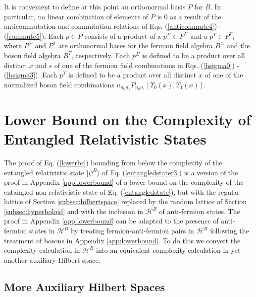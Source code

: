 \documentclass[12pt,amsmath,amssymb,onecolumn]{revtex4-2}
\begin{document}
It is convenient to define at this point an orthonormal basis $P$ for $B$.
In particular, no linear combination
of elements of $P$ is 0 as a result of the anticommutation and
commutation relations of Eqs. (\ref{anticommute4}) - (\ref{commute5}).
Each $p \in P$ consists of a product of a $p^\Sigma \in P^\Sigma$ and
a $p^\Upsilon \in P^\Upsilon$, where
$P^\Sigma$ and $P^\Upsilon$ are orthonormal bases for the fermion
field algebra $B^\Sigma$ and the boson field algebra $B^\Upsilon$, respectively.
Each $p^\Sigma$ is defined to be a product over all distinct $x$ and
$s$ of one of the fermion field combinations in Eqs. (\ref{hsigma0}) - (\ref{hsigma3}).
Each $p^\Upsilon$ is defined to be a product over all distinct $x$ of one of the normalized boson field
combinations $u_{n_0 n_1} P_{n_0 n_1}[\Upsilon_0(x),\Upsilon_1(x)]$.



\section{\label{app:lowerboundr} Lower Bound on the Complexity of Entangled Relativistic States}


The proof of Eq. (\ref{lowerbr}) bounding from below the
complexity of the entangled relativistic state $|\psi^B \rangle $ of Eq. (\ref{entangledstater3}) 
is a version of the proof in Appendix \ref{app:lowerbound} of a lower bound
on the complexity of the entangled non-relativistic state of Eq. (\ref{entangledstate}),
but with the regular lattice of Section \ref{subsec:hilbertspace} replaced by
the random lattice of Section \ref{subsec:hyperboloid}
and with the inclusion in $\mathcal{H}^B$ of anti-fermion states.
The proof in Appendix \ref{app:lowerbound}
can be adapted 
to the presence of anti-fermion states in $\mathcal{H}^B$
by treating fermion-anti-fermion pairs in $\mathcal{H}^B$
following the treatment of bosons in Appendix \ref{app:lowerbound}.
To do this we convert the complexity
calculation in $\mathcal{H}^B$ into an equivalent complexity
calculation in yet another auxiliary Hilbert space.



\subsection{\label{subsec:morehilbertspace} More Auxiliary Hilbert Spaces}
\end{document}

